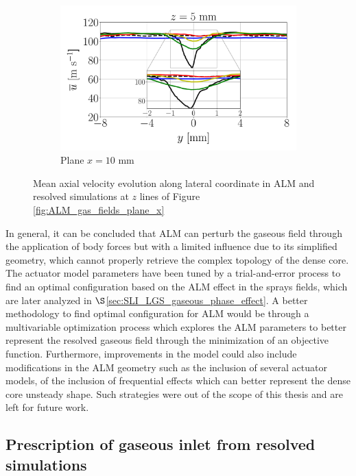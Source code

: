 \begin{figure}[ht]
\begin{subfigure}[b]{1.0\textwidth}
   \includegraphics[scale=0.24]{./part2_developments/figures_ch6_lagrangian_JICF/gas_field_initial_conditions/ALM_line_x10_z05p0_ux_mean_along_y}
   \vspace*{-0.1in}
	\caption{Plane $x = 10$ mm}
\end{subfigure}
   \caption{Mean axial velocity evolution along lateral coordinate in ALM and resolved simulations at $z$ lines of Figure \ref{fig:ALM_gas_fields_plane_x}}
\label{fig:JICF_ALM_lines_iso-x_along_y_ux_mean}
\end{figure}

In general, it can be concluded that ALM can  perturb the gaseous field through the application of body forces but with a limited influence due to its simplified geometry, which cannot properly retrieve the complex topology of the dense core. The actuator model parameters have been tuned by a trial-and-error process to find an optimal configuration based on the ALM effect in the sprays fields, which are later analyzed in $\S$\ref{sec:SLI_LGS_gaseous_phase_effect}. A better methodology to find optimal configuration for ALM would be through a multivariable optimization process which explores the ALM parameters to better represent the resolved gaseous field through the minimization of an objective function. Furthermore, improvements in the model could also include modifications in the ALM geometry such as the inclusion of several actuator models, of the inclusion of frequential effects which can better represent the dense core unsteady shape. Such strategies were out of the scope of this thesis and are left for future work. 


\subsection{Prescription of gaseous inlet from resolved simulations }
\label{subsec:ch6_jicf_lgs_gaseous_inlet_prescription}



